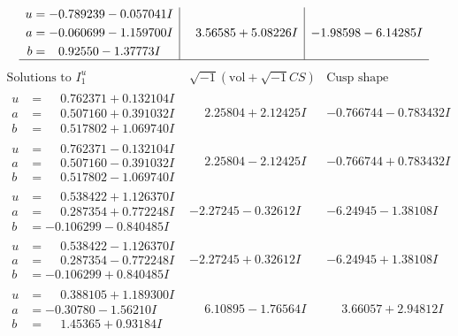 \documentclass[1p]{elsarticle_modified}
\theoremstyle{definition}
\newcommand{\I}{\sqrt{-1}}
\begin{document}
$$\begin{array}{c|c|c}
\begin{aligned}
u &= -0.789239 - 0.057041 I \\
a &= -0.060699 - 1.159700 I \\
b &= \phantom{-}0.92550 - 1.37773 I\end{aligned}
 & \phantom{-}3.56585 + 5.08226 I & -1.98598 - 6.14285 I\\
 \hline 
 \end{array}$$\newpage$$\begin{array}{c|c|c}  
\text{Solutions to }I^u_{1}& \I (\text{vol} + \sqrt{-1}CS) & \text{Cusp shape}\\
 \hline 
\begin{aligned}
u &= \phantom{-}0.762371 + 0.132104 I \\
a &= \phantom{-}0.507160 + 0.391032 I \\
b &= \phantom{-}0.517802 + 1.069740 I\end{aligned}
 & \phantom{-}2.25804 + 2.12425 I & -0.766744 - 0.783432 I \\ \hline\begin{aligned}
u &= \phantom{-}0.762371 - 0.132104 I \\
a &= \phantom{-}0.507160 - 0.391032 I \\
b &= \phantom{-}0.517802 - 1.069740 I\end{aligned}
 & \phantom{-}2.25804 - 2.12425 I & -0.766744 + 0.783432 I \\ \hline\begin{aligned}
u &= \phantom{-}0.538422 + 1.126370 I \\
a &= \phantom{-}0.287354 + 0.772248 I \\
b &= -0.106299 - 0.840485 I\end{aligned}
 & -2.27245 - 0.32612 I & -6.24945 - 1.38108 I \\ \hline\begin{aligned}
u &= \phantom{-}0.538422 - 1.126370 I \\
a &= \phantom{-}0.287354 - 0.772248 I \\
b &= -0.106299 + 0.840485 I\end{aligned}
 & -2.27245 + 0.32612 I & -6.24945 + 1.38108 I \\ \hline\begin{aligned}
u &= \phantom{-}0.388105 + 1.189300 I \\
a &= -0.30780 - 1.56210 I \\
b &= \phantom{-}1.45365 + 0.93184 I\end{aligned}
 & \phantom{-}6.10895 - 1.76564 I & \phantom{-}3.66057 + 2.94812 I \\ \hline\begin{aligned}

\end{aligned}
\end{array}$$
\end{document}

